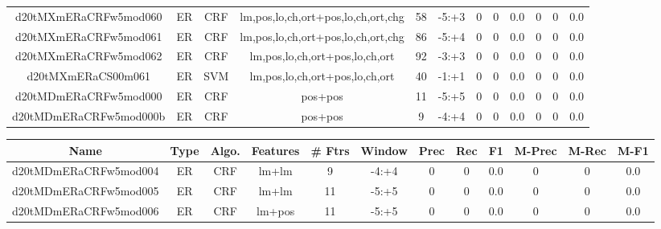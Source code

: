 \documentclass[a4paper]{article}
\begin{document}
\begin{landscape}
\begin{center}
\begin{tabular}{ |c|c|c|c|c|c|c|c|c|c|c|c|}
 
 	
 	\small{ d20tMXmERaCRFw5mod060 } & ER & CRF & lm,pos,lo,ch,ort+pos,lo,ch,ort,chg  &  58 &  -5:+3  &  0 & 0 & 0.0  &  0 & 0 & 0.0 \\
 	

 
 	
 	\small{ d20tMXmERaCRFw5mod061 } & ER & CRF & lm,pos,lo,ch,ort+pos,lo,ch,ort,chg  &  86 &  -5:+4  &  0 & 0 & 0.0  &  0 & 0 & 0.0 \\
 	

 
 	
 	\small{ d20tMXmERaCRFw5mod062 } & ER & CRF & lm,pos,lo,ch,ort+pos,lo,ch,ort  &  92 &  -3:+3  &  0 & 0 & 0.0  &  0 & 0 & 0.0 \\
 	

 
 	
 	\small{ d20tMXmERaCS00m061 } & ER & SVM & lm,pos,lo,ch,ort+pos,lo,ch,ort  &  40 &  -1:+1  &  0 & 0 & 0.0  &  0 & 0 & 0.0 \\
 	

 
 	
 	\small{ d20tMDmERaCRFw5mod000 } & ER & CRF & pos+pos  &  11 &  -5:+5  &  0 & 0 & 0.0  &  0 & 0 & 0.0 \\
 	

 
 	
 	\small{ d20tMDmERaCRFw5mod000b } & ER & CRF & pos+pos  &  9 &  -4:+4  &  0 & 0 & 0.0  &  0 & 0 & 0.0 \\
 	
 \hline
\end{tabular}
\end{center}




\begin{center}
\begin{tabular}{ |c|c|c|c|c|c|c|c|c|c|c|c|} 
 \hline
 	Name & Type & Algo. & Features & \# Ftrs & Window & Prec & Rec & F1 & M-Prec & M-Rec & M-F1\\
 \hline

 	

 
 	
 	\small{ d20tMDmERaCRFw5mod004 } & ER & CRF & lm+lm  &  9 &  -4:+4  &  0 & 0 & 0.0  &  0 & 0 & 0.0 \\
 	

 
 	
 	\small{ d20tMDmERaCRFw5mod005 } & ER & CRF & lm+lm  &  11 &  -5:+5  &  0 & 0 & 0.0  &  0 & 0 & 0.0 \\
 	

 
 	
 	\small{ d20tMDmERaCRFw5mod006 } & ER & CRF & lm+pos  &  11 &  -5:+5  &  0 & 0 & 0.0  &  0 & 0 & 0.0 \\
 	


\end{tabular}
\end{center}
\end{landscape}
\end{document}
